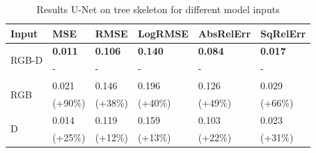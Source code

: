 { \setlength{\tabcolsep}{5pt}
\begin{table}[!t]
\caption{Results U-Net on tree skeleton for different model inputs}
\label{tab:res_inputs_branch}
\begin{tabular}{@{}l|lllll@{}}
\toprule
Input \phantom{iiii} & MSE \phantom{iiiiii} & RMSE \phantom{iiii} & LogRMSE & AbsRelErr & SqRelErr \\ \hline \hline
\multirow{2}{*}{RGB-D} & \textbf{0.011} & \textbf{0.106} & \textbf{0.140} & \textbf{0.084} & \textbf{0.017} \\
&\phantom{iiii}- & \phantom{iiii}- &\phantom{iiii}- & \phantom{iiii}- & \phantom{iiii}- \\ \hline
\multirow{2}{*}{RGB} & 0.021 &0.146 &0.196 &0.126 &0.029 \\
& (+90\%) &(+38\%) &(+40\%) &(+49\%) &(+66\%) \\ \hline
\multirow{2}{*}{D} & 0.014 &0.119 &0.159 &0.103 &0.023\\
&(+25\%) &(+12\%) &(+13\%) &(+22\%) &(+31\%)  \\  \bottomrule
\end{tabular}
\end{table}
\vspace{\figurevspacebelow} \phantom{i}
}

